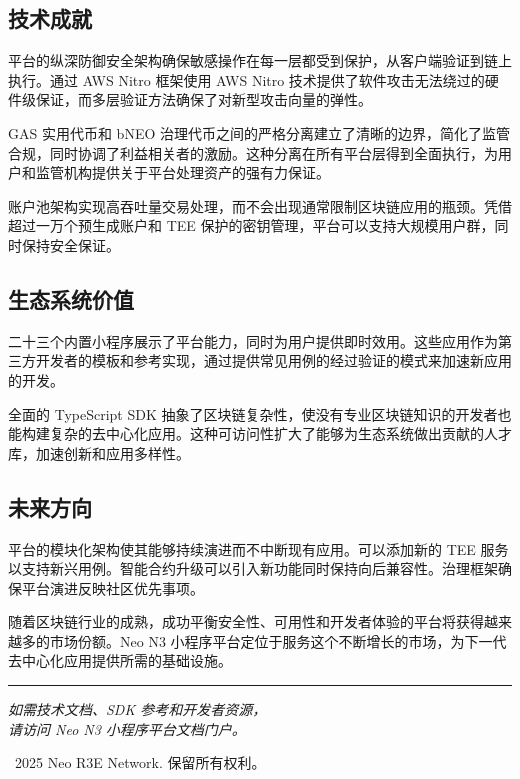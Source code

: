 \documentclass[11pt,a4paper]{article}
\begin{document}
\subsection{技术成就}

平台的纵深防御安全架构确保敏感操作在每一层都受到保护，从客户端验证到链上执行。通过 AWS Nitro 框架使用 AWS Nitro 技术提供了软件攻击无法绕过的硬件级保证，而多层验证方法确保了对新型攻击向量的弹性。

GAS 实用代币和 bNEO 治理代币之间的严格分离建立了清晰的边界，简化了监管合规，同时协调了利益相关者的激励。这种分离在所有平台层得到全面执行，为用户和监管机构提供关于平台处理资产的强有力保证。

账户池架构实现高吞吐量交易处理，而不会出现通常限制区块链应用的瓶颈。凭借超过一万个预生成账户和 TEE 保护的密钥管理，平台可以支持大规模用户群，同时保持安全保证。

\subsection{生态系统价值}

二十三个内置小程序展示了平台能力，同时为用户提供即时效用。这些应用作为第三方开发者的模板和参考实现，通过提供常见用例的经过验证的模式来加速新应用的开发。

全面的 TypeScript SDK 抽象了区块链复杂性，使没有专业区块链知识的开发者也能构建复杂的去中心化应用。这种可访问性扩大了能够为生态系统做出贡献的人才库，加速创新和应用多样性。

\subsection{未来方向}

平台的模块化架构使其能够持续演进而不中断现有应用。可以添加新的 TEE 服务以支持新兴用例。智能合约升级可以引入新功能同时保持向后兼容性。治理框架确保平台演进反映社区优先事项。

随着区块链行业的成熟，成功平衡安全性、可用性和开发者体验的平台将获得越来越多的市场份额。Neo N3 小程序平台定位于服务这个不断增长的市场，为下一代去中心化应用提供所需的基础设施。

\vspace{1cm}
\begin{center}
\rule{0.5\textwidth}{0.4pt}
\end{center}
\vspace{0.5cm}

\begin{center}
\textit{如需技术文档、SDK 参考和开发者资源，\\请访问 Neo N3 小程序平台文档门户。}
\end{center}

\vspace{1cm}
\begin{center}
{\small \textcopyright\ 2025 Neo R3E Network. 保留所有权利。}
\end{center}
\end{document}
